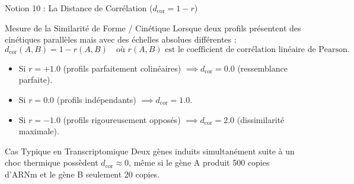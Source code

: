 \documentclass[aspectratio=169,10pt]{beamer}
\begin{document}
\begin{frame}{Notion 10 : La Distance de Corrélation ($d_{\text{cor}} = 1 - r$)}
  \begin{conceptbox}{Mesure de la Similarité de Forme / Cinétique}
    \footnotesize
    Lorsque deux profils présentent des cinétiques parallèles mais avec des échelles absolues différentes :
    \begin{equation*}
      d_{\text{cor}}(A, B) = 1 - r(A, B) \quad \text{où } r(A, B) \text{ est le coefficient de corrélation linéaire de Pearson.}
    \end{equation*}
    \begin{itemize}
      \item Si $r = +1.0$ (profils parfaitement colinéaires) $\implies d_{\text{cor}} = 0.0$ (ressemblance parfaite).
      \item Si $r = 0.0$ (profils indépendants) $\implies d_{\text{cor}} = 1.0$.
      \item Si $r = -1.0$ (profils rigoureusement opposés) $\implies d_{\text{cor}} = 2.0$ (dissimilarité maximale).
    \end{itemize}
  \end{conceptbox}
  \vspace{1mm}
  \begin{biobox}{Cas Typique en Transcriptomique}
    \footnotesize
    Deux gènes induits simultanément suite à un choc thermique possèdent $d_{\text{cor}} \approx 0$, même si le gène A produit 500 copies d'ARNm et le gène B seulement 20 copies.
  \end{biobox}
\end{frame}
\end{document}
